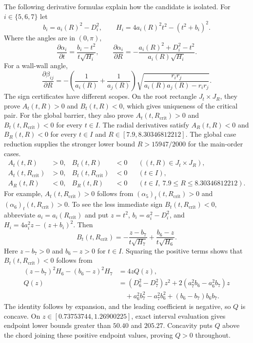 \documentclass[11pt,a4paper]{article}
\theoremstyle{remark}
\newcommand{\Rcrit}{R_{\mathrm{crit}}}
\begin{document}
The following derivative formulas explain how the candidate is isolated.
For $i\in\{5,6,7\}$ let
\[
 b_i=a_i(R)^2-D_i^2,\qquad
 H_i=4a_i(R)^2t^2-(t^2+b_i)^2.
\]
Where the angles are in $(0,\pi)$,
\begin{equation}
 \frac{\partial\alpha_i}{\partial t}
   =\frac{b_i-t^2}{t\sqrt{H_i}},\qquad
 \frac{\partial\alpha_i}{\partial R}
   =-\frac{a_i(R)^2+D_i^2-t^2}{a_i(R)\sqrt{H_i}}.
 \label{eq:alpha-derivatives}
\end{equation}
For a wall-wall angle,
\begin{equation}
 \frac{\partial\beta_{ij}}{\partial R}
  =-\left(\frac1{a_i(R)}+\frac1{a_j(R)}\right)
    \sqrt{\frac{r_ir_j}{a_i(R)a_j(R)-r_ir_j}}.
 \label{eq:beta-derivative}
\end{equation}
The sign certificates have different scopes.  On the root rectangle
$J_t\times J_R$, they prove $A_t(t,R)>0$ and $B_t(t,R)<0$, which gives
uniqueness of the critical pair.  For the global barrier, they also prove
$A_t(t,\Rcrit)>0$ and $B_t(t,\Rcrit)<0$ for every $t\in I$.  The radial
derivatives satisfy $A_R(t,R)<0$ and $B_R(t,R)<0$ for every $t\in I$ and
$R\in[7.9,8.30346812212]$.  The global case reduction supplies the stronger
lower bound $R>15947/2000$ for the main-order cases.
\begin{equation}
\begin{aligned}
  A_t(t,R)&>0, & B_t(t,R)&<0 &&((t,R)\in J_t\times J_R),\\
  A_t(t,\Rcrit)&>0, & B_t(t,\Rcrit)&<0 &&(t\in I),\\
  A_R(t,R)&<0, & B_R(t,R)&<0
    &&(t\in I,\ 7.9\le R\le8.30346812212).
\end{aligned}
\label{eq:root-signs}
\end{equation}
For example, $A_t(t,\Rcrit)>0$ follows from
$(\alpha_5)_t(t,\Rcrit)>0$ and $(\alpha_6)_t(t,\Rcrit)>0$.  To see the
less immediate sign $B_t(t,\Rcrit)<0$, abbreviate $a_i=a_i(\Rcrit)$ and put
$z=t^2$, $b_i=a_i^2-D_i^2$, and $H_i=4a_i^2z-(z+b_i)^2$.  Then
\[
 B_t(t,\Rcrit)=-\frac{z-b_7}{t\sqrt{H_7}}
       +\frac{b_6-z}{t\sqrt{H_6}}.
\]
Here $z-b_7>0$ and $b_6-z>0$ for $t\in I$.  Squaring the positive terms
shows that $B_t(t,\Rcrit)<0$ follows from
\begin{align*}
 (z-b_7)^2H_6-(b_6-z)^2H_7&=4zQ(z),\\
 Q(z)&=(D_6^2-D_7^2)z^2
       +2(a_7^2b_6-a_6^2b_7)z\\
     &\quad+a_6^2b_7^2-a_7^2b_6^2+(b_6-b_7)b_6b_7.
\end{align*}
The identity follows by expansion, and the leading coefficient is negative,
so $Q$ is concave.  On
$z\in[0.73753744,1.26900225]$, exact interval evaluation gives endpoint
lower bounds greater than $50.40$ and $205.27$.  Concavity puts $Q$ above the
chord joining these positive endpoint values, proving $Q>0$ throughout.
\end{document}
